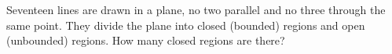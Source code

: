 Seventeen lines are drawn in a plane, no two parallel and no three through the same point. They divide the plane into closed (bounded) regions and open (unbounded) regions. How many closed regions are there?
